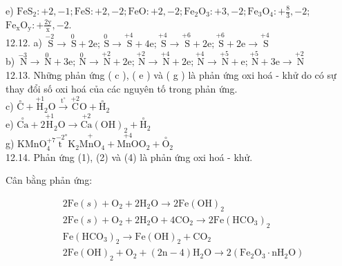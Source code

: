\documentclass[10pt]{article}
\begin{document}
e) $\mathrm{FeS}_{2}:+2,-1 ; \mathrm{FeS}:+2,-2 ; \mathrm{FeO}:+2,-2 ; \mathrm{Fe}_{2} \mathrm{O}_{3}:+3,-2 ; \mathrm{Fe}_{3} \mathrm{O}_{4}:+\frac{8}{3},-2$; $\mathrm{Fe}_{\mathrm{x}} \mathrm{O}_{\mathrm{y}}:+\frac{2 \mathrm{y}}{\mathrm{x}},-2$.\\
12.12. a) $\stackrel{-2}{\mathrm{~S}} \rightarrow \stackrel{0}{\mathrm{~S}}+2 \mathrm{e} ; \stackrel{0}{\mathrm{~S}} \rightarrow \stackrel{+4}{\mathrm{~S}}+4 \mathrm{e} ; \stackrel{+4}{\mathrm{~S}} \rightarrow \stackrel{+6}{\mathrm{~S}}+2 \mathrm{e} ; \stackrel{+6}{\mathrm{~S}}+2 \mathrm{e} \rightarrow \stackrel{+4}{\mathrm{~S}}$\\
b) $\stackrel{-3}{\mathrm{~N}} \rightarrow \stackrel{0}{\mathrm{~N}}+3 \mathrm{e} ; \stackrel{0}{\mathrm{~N}} \rightarrow \stackrel{+2}{\mathrm{~N}}+2 \mathrm{e} ; \stackrel{+2}{\mathrm{~N}} \rightarrow \stackrel{+4}{\mathrm{~N}}+2 \mathrm{e} ; \stackrel{+4}{\mathrm{~N}} \rightarrow \stackrel{+5}{\mathrm{~N}}+\mathrm{e} ; \stackrel{+5}{\mathrm{~N}}+3 \mathrm{e} \rightarrow \stackrel{+2}{\mathrm{~N}}$\\
12.13. Những phản ứng ( c ), ( e ) và ( g ) là phản ứng oxi hoá - khử do có sự thay đổi số oxi hoá của các nguyên tố trong phản ứng.\\
c) $\stackrel{\circ}{\mathrm{C}}+\stackrel{+1}{\mathrm{H}}_{2} \mathrm{O} \xrightarrow{\mathrm{t}^{\circ}} \stackrel{+2}{\mathrm{C}} \mathrm{O}+\stackrel{\circ}{\mathrm{H}}_{2}$\\
e) $\stackrel{\circ}{\mathrm{Ca}}+2 \stackrel{+1}{\mathrm{H}}_{2} \mathrm{O} \longrightarrow \stackrel{+2}{\mathrm{Ca}}(\mathrm{OH})_{2}+\stackrel{\circ}{\mathrm{H}}{ }_{2}$\\
g) $\mathrm{KMnO}_{4}^{+7} \stackrel{-2}{\mathrm{t}}^{\circ} \mathrm{K}_{2} \stackrel{+}{\mathrm{MnO}}_{4}+\stackrel{+4}{\mathrm{MnO}} \mathrm{O}_{2}+\stackrel{\circ}{\mathrm{O}}_{2}$\\
12.14. Phản ứng (1), (2) và (4) là phản ứng oxi hoá - khử.

Cân bằng phản ứng:


\begin{align*}
& 2 \mathrm{Fe}(s)+\mathrm{O}_{2}+2 \mathrm{H}_{2} \mathrm{O} \rightarrow 2 \mathrm{Fe}(\mathrm{OH})_{2}  \tag{1}\\
& 2 \mathrm{Fe}(s)+\mathrm{O}_{2}+2 \mathrm{H}_{2} \mathrm{O}+4 \mathrm{CO}_{2} \rightarrow 2 \mathrm{Fe}\left(\mathrm{HCO}_{3}\right)_{2}  \tag{2}\\
& \mathrm{Fe}\left(\mathrm{HCO}_{3}\right)_{2} \rightarrow \mathrm{Fe}(\mathrm{OH})_{2}+\mathrm{CO}_{2}  \tag{3}\\
& 2 \mathrm{Fe}(\mathrm{OH})_{2}+\mathrm{O}_{2}+(2 \mathrm{n}-4) \mathrm{H}_{2} \mathrm{O} \rightarrow 2\left(\mathrm{Fe}_{2} \mathrm{O}_{3} \cdot \mathrm{nH}_{2} \mathrm{O}\right) \tag{4}
\end{align*}
\end{document}
